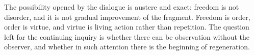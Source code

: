 The possibility opened by the dialogue is austere and exact: freedom is not disorder, and it is not gradual improvement of the fragment. Freedom is order, order is virtue, and virtue is living action rather than repetition. The question left for the continuing inquiry is whether there can be observation without the observer, and whether in such attention there is the beginning of regeneration.